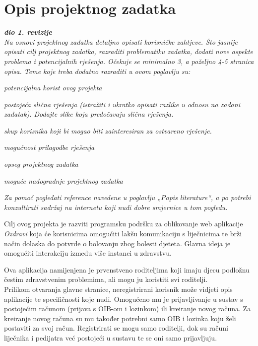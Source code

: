 \chapter{Opis projektnog zadatka}
		
		\textbf{\textit{dio 1. revizije}}\\
		
		\textit{Na osnovi projektnog zadatka detaljno opisati korisničke zahtjeve. Što jasnije opisati cilj projektnog zadatka, razraditi problematiku zadatka, dodati nove aspekte problema i potencijalnih rješenja. Očekuje se minimalno 3, a poželjno 4-5 stranica opisa.	Teme koje treba dodatno razraditi u ovom poglavlju su:}
		\begin{packed_item}
			\item \textit{potencijalna korist ovog projekta}
			\item \textit{postojeća slična rješenja (istražiti i ukratko opisati razlike u odnosu na zadani zadatak). Dodajte slike koja predočavaju slična rješenja.}
			\item \textit{skup korisnika koji bi mogao biti zainteresiran za ostvareno rješenje.}
			\item \textit{mogućnost prilagodbe rješenja }
			\item \textit{opseg projektnog zadatka}
			\item \textit{moguće nadogradnje projektnog zadatka}
		\end{packed_item}
		
		\textit{Za pomoć pogledati reference navedene u poglavlju „Popis literature“, a po potrebi konzultirati sadržaj na internetu koji nudi dobre smjernice u tom pogledu.}
		\eject
		
		Cilj ovog projekta je razviti programsku podršku za oblikovanje web aplikacije \textit{Ozdravi} koja će korisnicima omogućiti lakšu komunikaciju s liječnicima te brži način dolaska do potvrde o bolovanju zbog bolesti djeteta. Glavna ideja je omogućiti interakciju između više instanci u zdravstvu.
		
		Ova aplikacija namijenjena je prvenstveno roditeljima koji imaju djecu podložnu čestim zdravstvenim problemima, ali mogu ju koristiti svi roditelji.\\
		
		Prilikom otvaranja glavne stranice, neregistrirani korisnik može vidjeti opis aplikacije te specifičnosti koje nudi. Omogućeno mu je prijavljivanje u sustav s postojećim računom (prijava s OIB-om i lozinkom) ili kreiranje novog računa. Za kreiranje novog računa su mu također potrebni samo OIB i lozinka koju želi postaviti za svoj račun. Registrirati se mogu samo roditelji, dok su računi liječnika i pedijatra već postojeći u sustavu te se oni samo prijavljuju.\\
		
